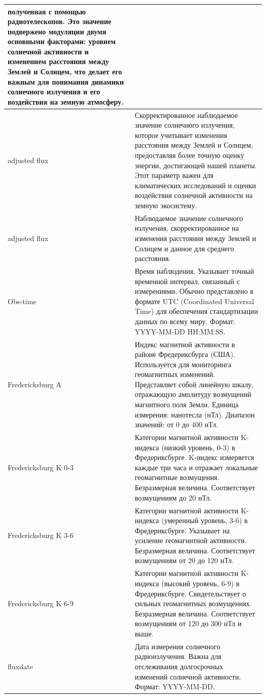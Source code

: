 \documentclass[14pt, a4paper]{bsu}
\begin{document}
\begin{longtable}{|l|p{12cm}|}
	полученная с помощью радиотелескопов. Это значение подвержено
	модуляции двумя основными факторами: уровнем солнечной активности и
	изменением расстояния между Землей и Солнцем, что делает его важным
	для понимания динамики солнечного излучения и его воздействия на
	земную атмосферу.
	\\ \hline adjusted flux         & Скорректированное наблюдаемое
	значение солнечного излучения, которое учитывает изменения
	расстояния между Землей и Солнцем, предоставляя более точную оценку
	энергии, достигающей нашей планеты. Этот параметр важен для
	климатических исследований и оценки воздействия солнечной
	активности на земную экосистему.
	\\ adjusted flux         & Наблюдаемое значение солнечного
	излучения, скорректированное на изменения расстояния между Землей и
	Солнцем и данное для среднего расстояния.
	\\ \hline Obs-time              & Время наблюдения. Указывает
	точный временной интервал, связанный с измерениями. Обычно
	представлено в формате UTC (Coordinated Universal Time) для
	обеспечения стандартизации данных по всему миру. Формат: YYYY-MM-DD
	HH:MM:SS.
	\\ \hline Fredericksburg A      & Индекс магнитной активности в
	районе Фредериксбурга (США). Используется для мониторинга
	геомагнитных изменений. Представляет собой линейную шкалу,
	отражающую амплитуду возмущений магнитного поля Земли. Единица
	измерения: нанотесла (нТл). Диапазон значений: от 0 до 400 нТл.
	\\ \hline Fredericksburg K 0-3  & Категории магнитной активности
	K-индекса (низкий уровень, 0-3) в Фредериксбурге. K-индекс
	измеряется каждые три часа и отражает локальные геомагнитные
	возмущения. Безразмерная величина. Соответствует возмущениям до 20
	нТл.
	\\ \hline Fredericksburg K 3-6  & Категории магнитной активности
	K-индекса (умеренный уровень, 3-6) в Фредериксбурге. Указывает на
	усиление геомагнитной активности. Безразмерная величина.
	Соответствует возмущениям от 20 до 120 нТл.
	\\ \hline Fredericksburg K 6-9  & Категории магнитной активности
	K-индекса (высокий уровень, 6-9) в Фредериксбурге. Свидетельствует
	о сильных геомагнитных возмущениях. Безразмерная величина.
	Соответствует возмущениям от 120 до 300 нТл и выше.
	\\ \hline fluxdate              & Дата измерения солнечного
	радиоизлучения. Важна для отслеживания долгосрочных изменений
	солнечной активности. Формат: YYYY-MM-DD.

\end{longtable}
\end{document}
